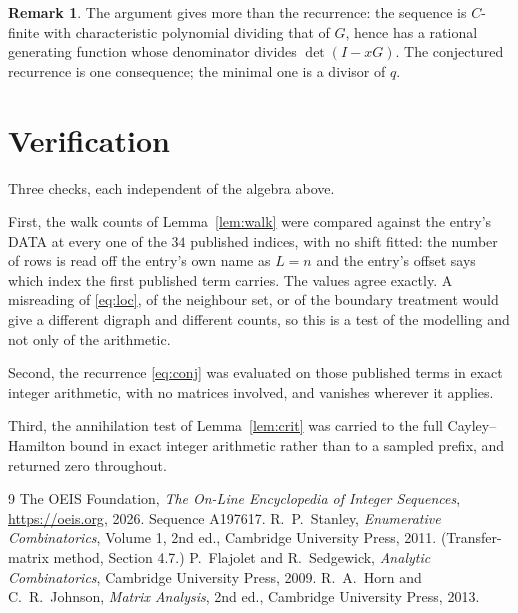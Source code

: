 \documentclass[11pt,a4paper]{article}
\theoremstyle{plain}
\theoremstyle{definition}
\newtheorem{remark}[theorem]{Remark}
\begin{document}
\begin{remark}
The argument gives more than the recurrence: the sequence is $C$-finite with characteristic
polynomial dividing that of $G$, hence has a rational generating function whose denominator
divides $\det(I-xG)$. The conjectured recurrence is one consequence; the minimal one is a
divisor of $q$.
\end{remark}

\section{Verification}

Three checks, each independent of the algebra above.

First, the walk counts of Lemma~\ref{lem:walk} were compared against the entry's DATA at
every one of the $34$ published indices, with no shift fitted: the number of rows is
read off the entry's own name as $L=n$ and the entry's offset says which index the first
published term carries. The values agree exactly. A misreading of \eqref{eq:loc}, of the
neighbour set, or of the boundary treatment would give a different digraph and different
counts, so this is a test of the modelling and not only of the arithmetic.

Second, the recurrence \eqref{eq:conj} was evaluated on those published terms in exact
integer arithmetic, with no matrices involved, and vanishes wherever it applies.

Third, the annihilation test of Lemma~\ref{lem:crit} was carried to the full
Cayley--Hamilton bound in exact integer arithmetic rather than to a sampled prefix, and
returned zero throughout.

\begin{thebibliography}{9}
 The OEIS Foundation, \emph{The On-Line Encyclopedia of Integer
Sequences}, \url{https://oeis.org}, 2026. Sequence A197617.
 R.~P.~Stanley, \emph{Enumerative Combinatorics}, Volume 1, 2nd ed.,
Cambridge University Press, 2011. (Transfer-matrix method, Section 4.7.)
 P.~Flajolet and R.~Sedgewick, \emph{Analytic Combinatorics}, Cambridge
University Press, 2009.
 R.~A.~Horn and C.~R.~Johnson, \emph{Matrix Analysis}, 2nd ed., Cambridge
University Press, 2013.
\end{thebibliography}
\end{document}
